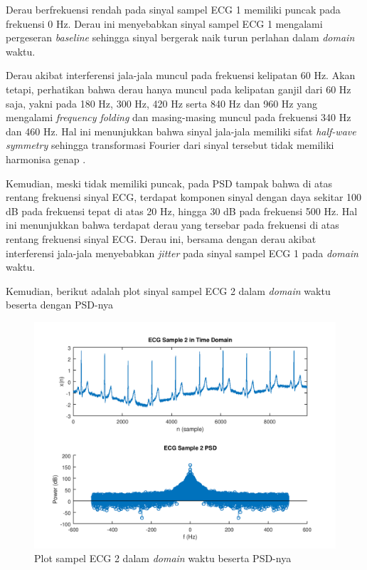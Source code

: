\documentclass[11pt]{article}
\begin{document}
Derau berfrekuensi rendah pada sinyal sampel ECG 1 memiliki puncak pada frekuensi 0 Hz. Derau ini menyebabkan sinyal sampel ECG 1 mengalami pergeseran \textit{baseline} sehingga sinyal bergerak naik turun perlahan dalam \textit{domain} waktu.

Derau akibat interferensi jala-jala muncul pada frekuensi kelipatan 60 Hz. Akan tetapi, perhatikan bahwa derau hanya muncul pada kelipatan ganjil dari 60 Hz saja, yakni pada 180 Hz, 300 Hz, 420 Hz serta 840 Hz dan 960 Hz yang mengalami \textit{frequency folding} dan masing-masing muncul pada frekuensi 340 Hz dan 460 Hz. Hal ini menunjukkan bahwa sinyal jala-jala memiliki sifat \textit{half-wave symmetry} sehingga transformasi Fourier dari sinyal tersebut tidak memiliki harmonisa genap \cite{grady}.

Kemudian, meski tidak memiliki puncak, pada PSD tampak bahwa di atas rentang frekuensi sinyal ECG, terdapat komponen sinyal dengan daya sekitar 100 dB pada frekuensi tepat di atas 20 Hz, hingga 30 dB pada frekuensi 500 Hz. Hal ini menunjukkan bahwa terdapat derau yang tersebar pada frekuensi di atas rentang frekuensi sinyal ECG. Derau ini, bersama dengan derau akibat interferensi jala-jala menyebabkan \textit{jitter} pada sinyal sampel ECG 1 pada \textit{domain} waktu.

Kemudian, berikut adalah plot sinyal sampel ECG 2 dalam \textit{domain} waktu beserta dengan PSD-nya

\begin{figure}[H]
\centerline{\includegraphics[scale=0.7]{figures/fig6-ecg2timeandpsd.png}}
\caption{Plot sampel ECG 2 dalam \textit{domain} waktu beserta PSD-nya}
\end{figure}
\end{document}
